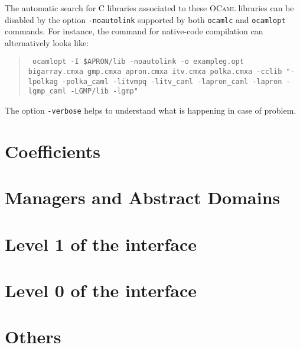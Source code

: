 \documentclass[twoside,10pt,a4paper]{report}
\begin{document}
The automatic search for C libraries associated to these
\textsc{OCaml} libraries can be disabled by the option
\texttt{-noautolink} supported by both \texttt{ocamlc} and
\texttt{ocamlopt} commands. For instance, the command for native-code compilation can alternatively looks like:
\begin{quote}\tt
  ocamlopt -I \$APRON/lib -noautolink -o exampleg.opt bigarray.cmxa gmp.cmxa apron.cmxa itv.cmxa polka.cmxa -cclib "-lpolkag -polka\_caml -litvmpq -litv\_caml -lapron\_caml -lapron -lgmp\_caml -LGMP/lib -lgmp"
\end{quote}

The option \texttt{-verbose} helps to understand what is happening
in case of problem.

\part{Coefficients}






\part{Managers and Abstract Domains}





\part{Level 1 of the interface}







\part{Level 0 of the interface}






\part{Others}




\appendix
\printindex
\end{document}
